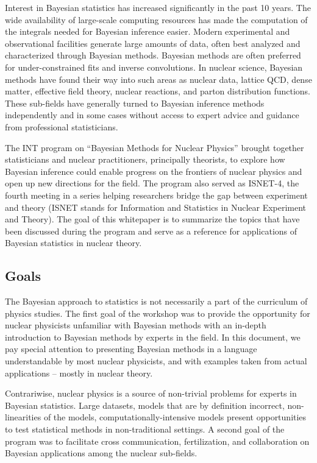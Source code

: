 Interest in Bayesian statistics has increased significantly in the past 10
years. The wide availability of large-scale computing resources has made the
computation of the integrals needed for Bayesian inference easier. Modern
experimental and observational facilities generate large amounts of data,
often best analyzed and characterized through Bayesian methods. Bayesian
methods are often preferred for under-constrained fits and inverse
convolutions. In nuclear science, Bayesian methods have found their way into
such areas as nuclear data, lattice QCD, dense matter, effective field theory,
nuclear reactions, and parton distribution functions. These sub-fields have
generally turned to Bayesian inference methods independently and in some cases
without access to expert advice and guidance from professional statisticians.

The INT program on ``Bayesian Methods for Nuclear Physics'' brought together
statisticians and nuclear practitioners, principally theorists, to explore how
Bayesian inference could enable progress on the frontiers of nuclear physics
and open up new directions for the field. The program also served as ISNET-4,
the fourth meeting in a series helping researchers bridge the gap between
experiment and theory (ISNET stands for Information and Statistics in Nuclear
Experiment and Theory). The goal of this whitepaper is to summarize the
topics that have been discussed during the program and serve as a reference
for applications of Bayesian statistics in nuclear theory.


\subsection{Goals} \label{subsec:goals}

The Bayesian approach to statistics is not necessarily a part of the curriculum
of physics studies. The first goal of the workshop was to provide the
opportunity for nuclear physicists unfamiliar with Bayesian methods with an
in-depth introduction to Bayesian methods by experts in the field. In this
document, we pay special attention to presenting Bayesian methods in a language
understandable by most nuclear physicists, and with examples taken from actual
applications -- mostly in nuclear theory.

Contrariwise, nuclear physics is a source of non-trivial problems for
experts in Bayesian statistics. Large datasets, models that are by definition
incorrect, non-linearities of the models, computationally-intensive models
present opportunities to test statistical methods in non-traditional settings.
A second goal of the program was to facilitate cross communication,
fertilization, and collaboration on Bayesian applications among the nuclear
sub-fields.

